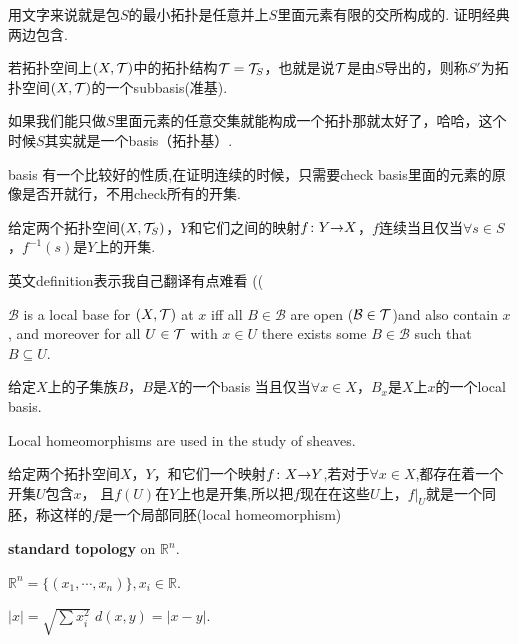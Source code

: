用文字来说就是包$S$的最小拓扑是任意并上$S$里面元素有限的交所构成的. 证明经典两边包含.

\begin{definition}
若拓扑空间上$(X,\mathcal{T})$中的拓扑结构$\mathcal{T} = \mathcal{T}_S$，也就是说$\mathcal{T}$是由$S$导出的，则称$S'$为拓扑空间$(X,\mathcal{T})$的一个\rm subbasis(准基).
\end{definition}

如果我们能只做$S$里面元素的任意交集就能构成一个拓扑那就太好了，哈哈，这个时候$S$其实就是一个basis（拓扑基）.

basis 有一个比较好的性质,在证明连续的时候，只需要check basis里面的元素的原像是否开就行，不用check所有的开集.

\begin{proposition}
给定两个拓扑空间$(X,\mathcal{T}_S)$，$Y$和它们之间的映射${f}\colon{Y}{\to}{X}$，$f$连续当且仅当$\forall s \in S$，$f^{-1}(s)$是$Y$上的开集.
\end{proposition}

英文definition表示我自己翻译有点难看 ((

\begin{definition}
\rm $\mathcal{B}$ is a local base for $(X,\mathcal{T})$ at $x$ iff all $B \in \mathcal{B}$ are open ($\mathcal{B} \in \mathcal{T}$)and also contain $x$, and moreover for all $U \in \mathcal{T}$ with $x \in U$ there exists some $B \in \mathcal{B}$ such that $B \subseteq U$.
\end{definition}


\begin{proposition}
给定$X$上的子集族$B$，$B$是$X$的一个basis 当且仅当$\forall x \in X$，$B_x$是$X$上$x$的一个local basis.
\end{proposition}

Local homeomorphisms are used in the study of sheaves.

\begin{definition}
\rm 给定两个拓扑空间$X$，$Y$，和它们一个映射${f}\colon{X}{\to}{Y}$,若对于$\forall x \in X$,都存在着一个开集$U$包含$x$， 且$f(U)$在$Y$上也是开集,所以把$f$现在在这些$U$上，$f|_U$就是一个同胚，称这样的$f$是一个局部同胚(local homeomorphism)
\end{definition}

\textbf{standard topology} on $\mathbb{R}^n$.
\begin{definition}
$\mathbb{R}^n = \{(x_1,\cdots,x_n)\},x_i \in \mathbb{R}$.
\end{definition}

\begin{definition}
$|x| = \sqrt{\sum x_i^2}$ $d(x,y)=|x-y|.$
\end{definition}

